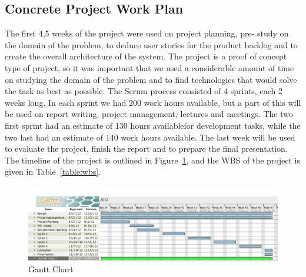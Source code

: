 \subsection{Concrete Project Work Plan}
The first 4,5 weeks of the project were used on project planning, pre- study on the domain of the problem, to deduce user stories for the product backlog and to create the overall architecture of the system. The project is a proof of concept type of project, so it was important that we used a considerable amount of time on studying the domain of the problem and to find technologies that would solve the task as best as possible. The Scrum process consisted of 4 sprints, each 2 weeks long. In each sprint we had 200 work hours available, but a part of this will be used on report writing, project management, lectures and meetings. The two first sprint had an estimate of 130 hours availablefor development tasks, while the two last had an estimate of 140 work hours available. The last week will be used to evaluate the project, finish the report and to prepare the final presentation. The timeline of the project is outlined in Figure~\ref{figure:gantt}, and the WBS of the project is given in Table~\ref{table:wbs}.


\begin{figure}
\centering
\includegraphics[width=6in]{image/gantt.png}
\caption{Gantt Chart}
\label{figure:gantt}
\end{figure}

